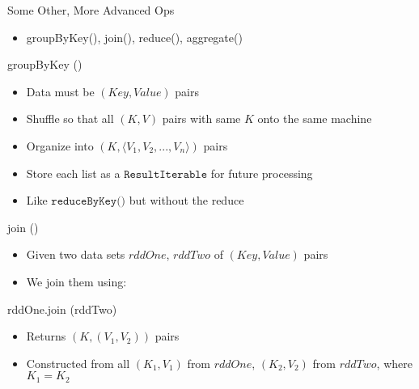 \documentclass[aspectratio=169]{beamer}
\begin{document}
\begin{frame}{Some Other, More Advanced Ops}

\begin{itemize}
\item groupByKey(), join(), reduce(), aggregate()
\end{itemize}
\end{frame}
\begin{frame}{groupByKey ()}

\begin{itemize}
\item Data must be $(Key, Value)$ pairs
\item Shuffle so that all $(K, V)$ pairs with same $K$ onto the same machine
\item Organize into $(K, \langle V_1, V_2, ..., V_n \rangle)$ pairs
\item Store each list as a $\texttt{ResultIterable}$ for future processing
\item Like $\texttt{reduceByKey()}$ but without the reduce
\end{itemize}
\end{frame}
\begin{frame}[fragile]{join ()}

\begin{itemize}
\item Given two data sets $rddOne$, $rddTwo$ of $(Key, Value)$ pairs
\item We join them using:
\end{itemize}

\begin{SQL}
rddOne.join (rddTwo)
\end{SQL}

\begin{itemize}
\item Returns $(K, (V_1, V_2))$ pairs
\item Constructed from all $(K_1, V_1)$ from $rddOne$, $(K_2, V_2)$ from $rddTwo$, where $K_1 = K_2$
\end{itemize}
\end{frame}
\end{document}
